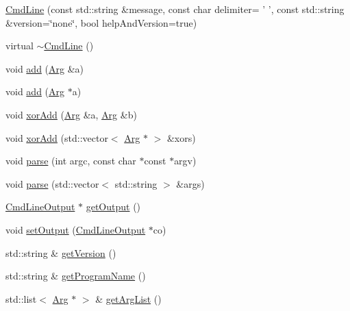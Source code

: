 \begin{DoxyCompactItemize}
\item 
\hyperlink{class_t_c_l_a_p_1_1_cmd_line_a2e62a3493f8700afb49a7deb872a5b96}{Cmd\+Line} (const std\+::string \&message, const char delimiter= ' ', const std\+::string \&version=\char`\"{}none\char`\"{}, bool help\+And\+Version=true)
\item 
virtual \hyperlink{class_t_c_l_a_p_1_1_cmd_line_a8a7bddba32c3d96e2a01e4c8e160e6fa}{$\sim$\+Cmd\+Line} ()
\item 
void \hyperlink{class_t_c_l_a_p_1_1_cmd_line_a94c511d4735ad9b8c97edaa3827f8bbf}{add} (\hyperlink{class_t_c_l_a_p_1_1_arg}{Arg} \&a)
\item 
void \hyperlink{class_t_c_l_a_p_1_1_cmd_line_ab8a08e8f4d3ca7709c85416f76e805a3}{add} (\hyperlink{class_t_c_l_a_p_1_1_arg}{Arg} $\ast$a)
\item 
void \hyperlink{class_t_c_l_a_p_1_1_cmd_line_afbaa2071d0c3276b383089acabdc0dd2}{xor\+Add} (\hyperlink{class_t_c_l_a_p_1_1_arg}{Arg} \&a, \hyperlink{class_t_c_l_a_p_1_1_arg}{Arg} \&b)
\item 
void \hyperlink{class_t_c_l_a_p_1_1_cmd_line_ac7f2d7ee32a5157f625ad9833ab148cf}{xor\+Add} (std\+::vector$<$ \hyperlink{class_t_c_l_a_p_1_1_arg}{Arg} $\ast$ $>$ \&xors)
\item 
void \hyperlink{class_t_c_l_a_p_1_1_cmd_line_acb07daf5a1370c176a7b4a6e4119fe6e}{parse} (int argc, const char $\ast$const $\ast$argv)
\item 
void \hyperlink{class_t_c_l_a_p_1_1_cmd_line_a712c3edf86aa0a8a28fb0b6d504d945a}{parse} (std\+::vector$<$ std\+::string $>$ \&args)
\item 
\hyperlink{class_t_c_l_a_p_1_1_cmd_line_output}{Cmd\+Line\+Output} $\ast$ \hyperlink{class_t_c_l_a_p_1_1_cmd_line_ad8aea2617edf53bbc20c8964ee5476e6}{get\+Output} ()
\item 
void \hyperlink{class_t_c_l_a_p_1_1_cmd_line_a4506e305cd10437c7ce5a5ba34cfed0f}{set\+Output} (\hyperlink{class_t_c_l_a_p_1_1_cmd_line_output}{Cmd\+Line\+Output} $\ast$co)
\item 
std\+::string \& \hyperlink{class_t_c_l_a_p_1_1_cmd_line_a85b5653d1a5b48fe6accead64615cf33}{get\+Version} ()
\item 
std\+::string \& \hyperlink{class_t_c_l_a_p_1_1_cmd_line_a47a6d496980ee11ffc42e27144a61797}{get\+Program\+Name} ()
\item 
std\+::list$<$ \hyperlink{class_t_c_l_a_p_1_1_arg}{Arg} $\ast$ $>$ \& \hyperlink{class_t_c_l_a_p_1_1_cmd_line_a3c281da929a281fb883ea47632b7ad38}{get\+Arg\+List} ()

\end{DoxyCompactItemize}
